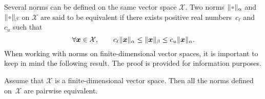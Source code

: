 Several norms can be defined on the same vector space $\mathcal X$.
Two norms $\norm{\placeholder}_{\alpha}$ and $\norm{\placeholder}_{\beta}$ on $\mathcal X$ are said to be equivalent if
there exists positive real numbers~$c_{\ell}$ and $c_u$ such that
\begin{equation}
    \label{eq:norm_equilavence}
    \forall \mathbf{\boldsymbol{x}} \in \mathcal X,
    \qquad c_{\ell} \lVert\mathbf{\boldsymbol{x}}\rVert_{\alpha}
    \leq \lVert\mathbf{\boldsymbol{x}}\rVert_{\beta}
    \leq c_u \lVert\mathbf{\boldsymbol{x}}\rVert_{\alpha}.
\end{equation}
When working with norms on finite-dimensional vector spaces,
it is important to keep in mind the following result.
The proof is provided for information purposes.
\begin{proposition}
    Assume that $\mathcal X$ is a finite-dimensional vector space.
    Then all the norms defined on~$\mathcal X$ are pairwise equivalent.
\end{proposition}
